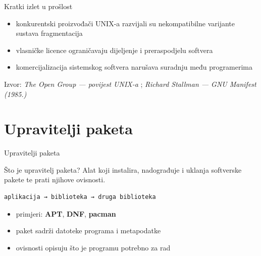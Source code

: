 \documentclass{beamer}
\begin{document}
\begin{frame}{Kratki izlet u prošlost}

	\begin{itemize}
		\item konkurentski proizvođači UNIX-a razvijali su nekompatibilne varijante sustava \textrightarrow{} fragmentacija
		\item vlasničke licence ograničavaju dijeljenje i preraspodjelu softvera
		\item komercijalizacija sistemskog softvera narušava suradnju među programerima
	\end{itemize}

	\vfill
	{\scriptsize Izvor: \emph{The Open Group --- povijest UNIX-a} \cite{unix-history}; \emph{Richard Stallman --- GNU Manifest (1985.)} \cite{gnu-manifesto}}
\end{frame}

\section{Upravitelji paketa}

\begin{frame}{Upravitelji paketa}
\end{frame}

\begin{frame}[fragile]{Što je upravitelj paketa?}
	Alat koji instalira, nadograđuje i uklanja softverske pakete te prati njihove ovisnosti.

	\vspace{0.5em}
	\begin{lstlisting}
aplikacija → biblioteka → druga biblioteka
\end{lstlisting}

	\begin{itemize}
		\item primjeri: \textbf{APT}, \textbf{DNF}, \textbf{pacman}
		\item paket sadrži datoteke programa i metapodatke
		\item ovisnosti opisuju što je programu potrebno za rad
	\end{itemize}
\end{frame}
\end{document}
